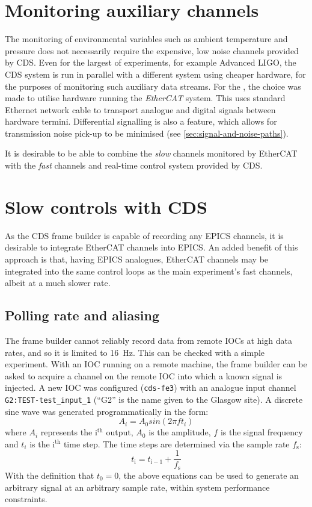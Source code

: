 \section{Monitoring auxiliary channels}
The monitoring of environmental variables such as ambient temperature and pressure does not necessarily require the expensive, low noise channels provided by \gls{CDS}. Even for the largest of experiments, for example Advanced LIGO, the \gls{CDS} system is run in parallel with a different system using cheaper hardware, for the purposes of monitoring such auxiliary data streams. For the \SSMEXPT{}, the choice was made to utilise hardware running the \emph{EtherCAT} system. This uses standard Ethernet network cable to transport analogue and digital signals between hardware termini. Differential signalling is also a feature, which allows for transmission noise pick-up to be minimised (see \ref{sec:signal-and-noise-paths}).

It is desirable to be able to combine the \emph{slow} channels monitored by EtherCAT with the \emph{fast} channels and real-time control system provided by \gls{CDS}.

\section{Slow controls with CDS}
As the \gls{CDS} frame builder is capable of recording any \gls{EPICS} channels, it is desirable to integrate EtherCAT channels into \gls{EPICS}. An added benefit of this approach is that, having \gls{EPICS} analogues, EtherCAT channels may be integrated into the same control loops as the main experiment's fast channels, albeit at a much slower rate.

\subsection{Polling rate and aliasing}
The frame builder cannot reliably record data from remote \glspl{IOC} at high data rates, and so it is limited to \SI{16}{\hertz}. This can be checked with a simple experiment. With an \gls{IOC} running on a remote machine, the frame builder can be asked to acquire a channel on the remote \gls{IOC} into which a known signal is injected. A new \gls{IOC} was configured (\lstinline!cds-fe3!) with an analogue input channel \lstinline!G2:TEST-test_input_1! (``G2'' is the name given to the Glasgow site). A discrete sine wave was generated programmatically in the form:
\begin{equation}
  \label{eq:programmatic-sine}
  A_{i} = A_0 sin \left( 2 \pi f t_{i} \right)
\end{equation}
where $A_{i}$ represents the $\text{i}^{\text{th}}$ output, $A_0$ is the amplitude, $f$ is the signal frequency and $t_{i}$ is the $\text{i}^{\text{th}}$ time step. The time steps are determined via the sample rate $f_{\text{s}}$:
\begin{equation}
  \label{eq:programmatic-time-step}
  t_{\text{i}} = t_{\text{i}-1} + \frac{1}{f_{\text{s}}}
\end{equation}
With the definition that $t_{0} = 0$, the above equations can be used to generate an arbitrary signal at an arbitrary sample rate, within system performance constraints.

